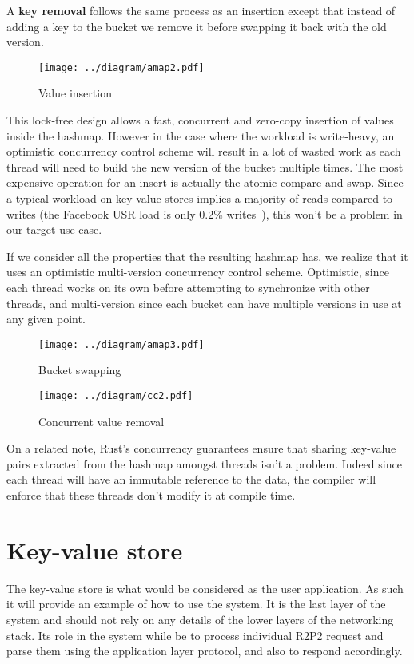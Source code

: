 A \textbf{key removal} follows the same process as an insertion except
that instead of adding a key to the bucket we remove it before
swapping it back with the old version.

\begin{figure}[htb!]
  \texttt{[image: ../diagram/amap2.pdf]}
  \caption{Value insertion}
  \label{fig:omvcc-insert}
\end{figure}

This lock-free design allows a fast, concurrent and zero-copy
insertion of values inside the hashmap. However in the case where the
workload is write-heavy, an optimistic concurrency control scheme will
result in a lot of wasted work as each thread will need to build
the new version of the bucket multiple times. The most expensive
operation for an insert is actually the atomic compare and swap. Since
a typical workload on key-value stores implies a majority of reads
compared to writes (the Facebook USR load is only 0.2\%
writes~\cite{memcached}), this won't be a problem in our target use
case.

If we consider all the properties that the resulting hashmap
has, we realize that it uses an optimistic multi-version concurrency
control scheme. Optimistic, since each thread works on its own before
attempting to synchronize with other threads, and multi-version since
each bucket can have multiple versions in use at any given point.

\begin{figure}
  \texttt{[image: ../diagram/amap3.pdf]}
  \caption{Bucket swapping}
  \label{fig:omvcc-swap}
\end{figure}

\begin{figure}[htb!]
  \texttt{[image: ../diagram/cc2.pdf]}
  \caption{Concurrent value removal}
  \label{fig:cc2}
\end{figure}

On a related note, Rust's concurrency guarantees ensure that sharing
key-value pairs extracted from the hashmap amongst threads isn't a
problem. Indeed since each thread will have an immutable reference to
the data, the compiler will enforce that these threads don't modify it
at compile time.

\section{Key-value store}

The key-value store is what would be considered as the user
application. As such it will provide an example of how to use the
system. It is the last layer of the system and should not rely on any
details of the lower layers of the networking stack. Its role in the
system while be to process individual R2P2 request and parse them
using the application layer protocol, and also to respond
accordingly.

